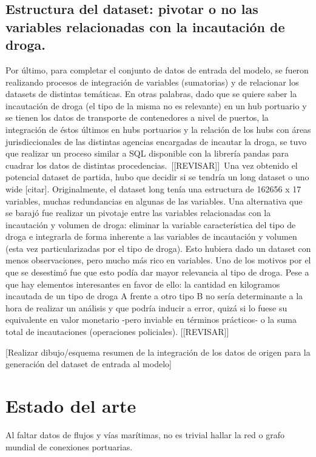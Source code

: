 \documentclass{article}
\begin{document}
\subsection{Estructura del dataset: pivotar o no las variables relacionadas con la incautación de droga.}
Por último, para completar el conjunto de datos de entrada del modelo, se fueron realizando procesos de integración de variables (sumatorias) y de relacionar los datasets de distintas temáticas. En otras palabras, dado que se quiere saber la incautación de droga (el tipo de la misma no es relevante) en un hub portuario y se tienen los datos de transporte de contenedores a nivel de puertos, la integración de éstos últimos en hubs portuarios y la relación de los hubs con áreas jurisdiccionales de las distintas agencias encargadas de incautar la droga, se tuvo que realizar un proceso similar a SQL disponible con la librería pandas para cuadrar los datos de distintas procedencias.\
[[REVISAR]]\
Una vez obtenido el potencial dataset de partida, hubo que decidir si se tendría un long dataset o uno wide [citar]. Originalmente, el dataset long tenía una estructura de 162656 x 17 variables, muchas redundancias en algunas de las variables. Una alternativa que se barajó fue realizar un pivotaje entre las variables relacionadas con la incautación y volumen de droga: eliminar la variable característica del tipo de droga e integrarla de forma inherente a las variables de incautación y volumen (esta vez particularizadas por el tipo de droga). Esto hubiera dado un dataset con menos observaciones, pero mucho más rico en variables. Uno de los motivos por el que se desestimó fue que esto podía dar mayor relevancia al tipo de droga. Pese a que hay elementos interesantes en favor de ello: la cantidad en kilogramos incautada de un tipo de droga A frente a otro tipo B no sería determinante a la hora de realizar un análisis y que podría inducir a error, quizá si lo fuese su equivalente en valor monetario -pero inviable en términos prácticos- o la suma total de incautaciones (operaciones policiales). [[REVISAR]]\


[Realizar dibujo/esquema resumen de la integración de los datos de origen para la generación del dataset de entrada al modelo]

\section{Estado del arte}

Al faltar datos de flujos y vías marítimas, no es trivial hallar la red o grafo mundial de conexiones portuarias.
\end{document}

